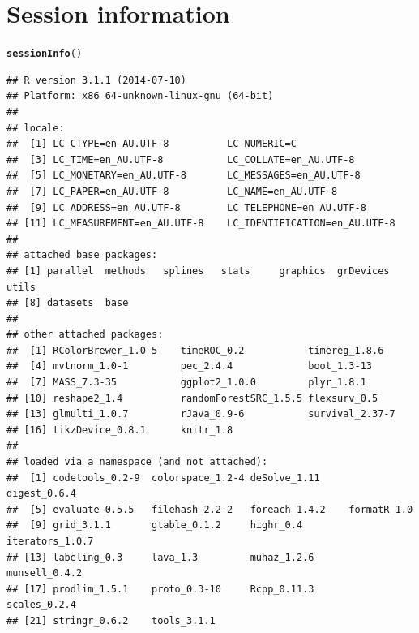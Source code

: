 \documentclass{article}\usepackage[]{graphicx}\usepackage[]{color}
\makeatletter
\newcommand{\hlstd}[1]{\textcolor[rgb]{0.345,0.345,0.345}{#1}}%
\newcommand{\hlkwd}[1]{\textcolor[rgb]{0.737,0.353,0.396}{\textbf{#1}}}%
\newenvironment{kframe}{%
 \def\at@end@of@kframe{}%
 \ifinner\ifhmode%
  \def\at@end@of@kframe{\end{minipage}}%
  \begin{minipage}{\columnwidth}%
 \fi\fi%
 \def\FrameCommand##1{\hskip\@totalleftmargin \hskip-\fboxsep
 \colorbox{shadecolor}{##1}\hskip-\fboxsep
     \hskip-\linewidth \hskip-\@totalleftmargin \hskip\columnwidth}%
 \MakeFramed {\advance\hsize-\width
   \@totalleftmargin\z@ \linewidth\hsize
   \@setminipage}}%
 {\par\unskip\endMakeFramed%
 \at@end@of@kframe}
\newenvironment{knitrout}{}{} %
\makeatother
\begin{document}
\section{Session information}
\begin{knitrout}
\color{fgcolor}\begin{kframe}
\begin{alltt}
\hlkwd{sessionInfo}\hlstd{()}
\end{alltt}
\begin{verbatim}
## R version 3.1.1 (2014-07-10)
## Platform: x86_64-unknown-linux-gnu (64-bit)
## 
## locale:
##  [1] LC_CTYPE=en_AU.UTF-8          LC_NUMERIC=C                 
##  [3] LC_TIME=en_AU.UTF-8           LC_COLLATE=en_AU.UTF-8       
##  [5] LC_MONETARY=en_AU.UTF-8       LC_MESSAGES=en_AU.UTF-8      
##  [7] LC_PAPER=en_AU.UTF-8          LC_NAME=en_AU.UTF-8          
##  [9] LC_ADDRESS=en_AU.UTF-8        LC_TELEPHONE=en_AU.UTF-8     
## [11] LC_MEASUREMENT=en_AU.UTF-8    LC_IDENTIFICATION=en_AU.UTF-8
## 
## attached base packages:
## [1] parallel  methods   splines   stats     graphics  grDevices utils    
## [8] datasets  base     
## 
## other attached packages:
##  [1] RColorBrewer_1.0-5    timeROC_0.2           timereg_1.8.6        
##  [4] mvtnorm_1.0-1         pec_2.4.4             boot_1.3-13          
##  [7] MASS_7.3-35           ggplot2_1.0.0         plyr_1.8.1           
## [10] reshape2_1.4          randomForestSRC_1.5.5 flexsurv_0.5         
## [13] glmulti_1.0.7         rJava_0.9-6           survival_2.37-7      
## [16] tikzDevice_0.8.1      knitr_1.8            
## 
## loaded via a namespace (and not attached):
##  [1] codetools_0.2-9  colorspace_1.2-4 deSolve_1.11     digest_0.6.4    
##  [5] evaluate_0.5.5   filehash_2.2-2   foreach_1.4.2    formatR_1.0     
##  [9] grid_3.1.1       gtable_0.1.2     highr_0.4        iterators_1.0.7 
## [13] labeling_0.3     lava_1.3         muhaz_1.2.6      munsell_0.4.2   
## [17] prodlim_1.5.1    proto_0.3-10     Rcpp_0.11.3      scales_0.2.4    
## [21] stringr_0.6.2    tools_3.1.1
\end{verbatim}
\end{kframe}
\end{knitrout}
\end{document}
